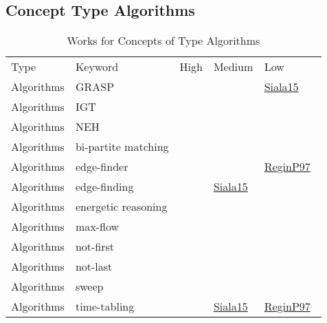 \clearpage
\subsection{Concept Type Algorithms}
\label{sec:Algorithms}
{\scriptsize
\begin{longtable}{lp{3cm}>{\raggedright\arraybackslash}p{6cm}>{\raggedright\arraybackslash}p{6cm}>{\raggedright\arraybackslash}p{8cm}}
\rowcolor{white}\caption{Works for Concepts of Type Algorithms}\\ \toprule
\rowcolor{white}Type & Keyword & High & Medium & Low\\ \midrule\endhead
\bottomrule
\endfoot
Algorithms & GRASP &  &  & \href{cars/works/Siala15.pdf}{Siala15}~\cite{Siala15}\\
Algorithms & IGT &  &  & \\
Algorithms & NEH &  &  & \\
Algorithms & bi-partite matching &  &  & \\
Algorithms & edge-finder &  &  & \href{cars/works/ReginP97.pdf}{ReginP97}~\cite{ReginP97}\\
Algorithms & edge-finding &  & \href{cars/works/Siala15.pdf}{Siala15}~\cite{Siala15} & \\
Algorithms & energetic reasoning &  &  & \\
Algorithms & max-flow &  &  & \\
Algorithms & not-first &  &  & \\
Algorithms & not-last &  &  & \\
Algorithms & sweep &  &  & \\
Algorithms & time-tabling &  & \href{cars/works/Siala15.pdf}{Siala15}~\cite{Siala15} & \href{cars/works/ReginP97.pdf}{ReginP97}~\cite{ReginP97}\\
\end{longtable}
}

